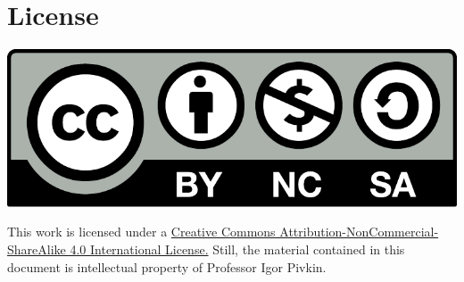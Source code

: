\section*{License}
\begin{center}
\includegraphics[scale=0.35]{Other/logo.pdf}
\end{center}
This work is licensed under a \href{http://creativecommons.org/licenses/by-nc-sa/4.0/}{Creative Commons Attribution-NonCommercial-ShareAlike 4.0 International License.} Still, the material contained in this document is intellectual property of Professor Igor Pivkin.
